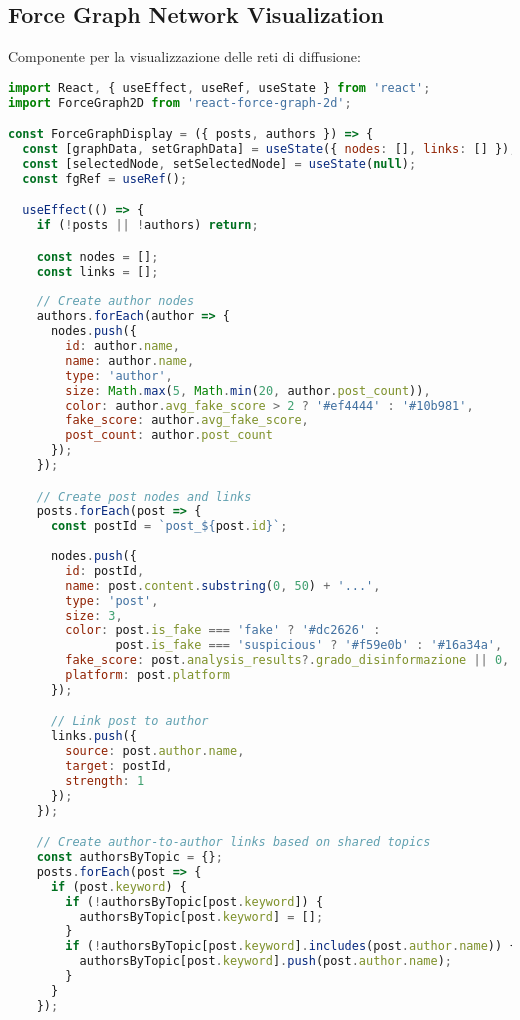 \documentclass[12pt,a4paper]{report}
\begin{document}
\subsection{Force Graph Network Visualization}

Componente per la visualizzazione delle reti di diffusione:

\begin{lstlisting}[language=JavaScript, caption=ForceGraphDisplay.jsx]
import React, { useEffect, useRef, useState } from 'react';
import ForceGraph2D from 'react-force-graph-2d';

const ForceGraphDisplay = ({ posts, authors }) => {
  const [graphData, setGraphData] = useState({ nodes: [], links: [] });
  const [selectedNode, setSelectedNode] = useState(null);
  const fgRef = useRef();

  useEffect(() => {
    if (!posts || !authors) return;

    const nodes = [];
    const links = [];
    
    // Create author nodes
    authors.forEach(author => {
      nodes.push({
        id: author.name,
        name: author.name,
        type: 'author',
        size: Math.max(5, Math.min(20, author.post_count)),
        color: author.avg_fake_score > 2 ? '#ef4444' : '#10b981',
        fake_score: author.avg_fake_score,
        post_count: author.post_count
      });
    });

    // Create post nodes and links
    posts.forEach(post => {
      const postId = `post_${post.id}`;
      
      nodes.push({
        id: postId,
        name: post.content.substring(0, 50) + '...',
        type: 'post',
        size: 3,
        color: post.is_fake === 'fake' ? '#dc2626' : 
               post.is_fake === 'suspicious' ? '#f59e0b' : '#16a34a',
        fake_score: post.analysis_results?.grado_disinformazione || 0,
        platform: post.platform
      });

      // Link post to author
      links.push({
        source: post.author.name,
        target: postId,
        strength: 1
      });
    });

    // Create author-to-author links based on shared topics
    const authorsByTopic = {};
    posts.forEach(post => {
      if (post.keyword) {
        if (!authorsByTopic[post.keyword]) {
          authorsByTopic[post.keyword] = [];
        }
        if (!authorsByTopic[post.keyword].includes(post.author.name)) {
          authorsByTopic[post.keyword].push(post.author.name);
        }
      }
    });


\end{lstlisting}
\end{document}
